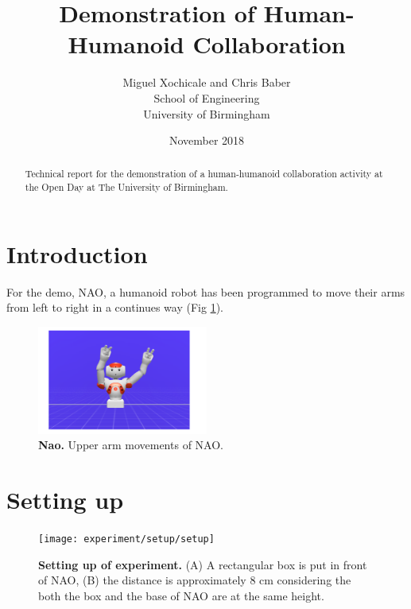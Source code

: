 \documentclass[12pt]{article}
\title{Demonstration of Human-Humanoid Collaboration}
\author{Miguel Xochicale and Chris Baber \\ 
School of Engineering \\
University of Birmingham
}
\date{November 2018}
\begin{document}
\maketitle


\begin{abstract}
Technical report for the demonstration of a human-humanoid collaboration 
activity at the Open Day at The University of Birmingham.
\end{abstract}

\section{Introduction}
For the demo, NAO, a humanoid robot \cite{gouaillier2008} has been programmed 
to move their arms from left to right in a continues way (Fig \ref{fig:nao}).




\begin{figure}[ht]
\centering
\includegraphics[width=0.5\textwidth]{nao/naoarms}
    \caption{
	{\bf Nao.}
	 Upper arm movements of NAO.
        }
\label{fig:nao}
\end{figure}



\section{Setting up}

\begin{figure}[ht]
\centering
\texttt{[image: experiment/setup/setup]}
    \caption{
	{\bf Setting up of experiment.}
	(A) A rectangular box is put in front of NAO,  
	(B) the distance is approximately 8 cm considering the 
	both the box and the base of NAO are at the same height.
        }
\label{fig:st}
\end{figure}
\end{document}
